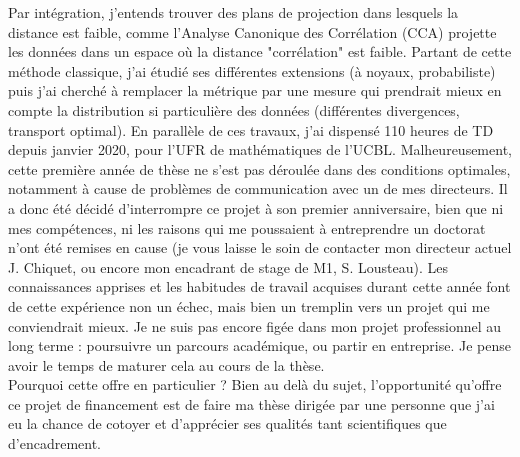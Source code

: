 \documentclass[a4paper,11pt]{article}
\begin{document}
%
Par intégration, j'entends trouver des plans de projection dans lesquels la distance est faible, comme l'Analyse Canonique des Corrélation (CCA) projette les données dans un espace où la distance "corrélation" est faible. Partant de cette méthode classique, j'ai étudié ses différentes extensions (à noyaux, probabiliste) puis j'ai cherché à remplacer la métrique par une mesure qui prendrait mieux en compte la distribution si particulière des données (différentes divergences, transport optimal). 
En parallèle de ces travaux, j'ai dispensé 110 heures de TD depuis janvier 2020, pour l'UFR de mathématiques de l'UCBL. 
Malheureusement, cette première année de thèse ne s'est pas déroulée dans des conditions optimales, notamment à cause de problèmes de communication avec un de mes directeurs. 
%
Il a donc été décidé d'interrompre ce projet à son premier anniversaire, bien que ni mes compétences, ni les raisons qui me poussaient à entreprendre un doctorat n'ont été remises en cause (je vous laisse le soin de contacter mon directeur actuel J. Chiquet, ou encore mon encadrant de stage de M1, S. Lousteau).
%
Les connaissances apprises et les habitudes de travail acquises durant cette année font de cette expérience non un échec, mais bien un tremplin vers un projet qui me conviendrait mieux. 
%
Je ne suis pas encore figée dans mon projet professionnel au long terme : poursuivre un parcours académique, ou partir en entreprise. Je pense avoir le temps de maturer cela au cours de la thèse. 
%
\\

Pourquoi cette offre en particulier ?  
Bien au delà du sujet, l'opportunité qu'offre ce projet de financement est de faire ma thèse dirigée par une personne que j'ai eu la chance de cotoyer et d'apprécier ses qualités tant scientifiques que d'encadrement. 
\end{document}
